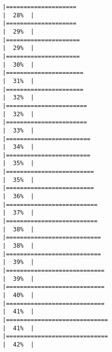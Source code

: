 \documentclass[
]{book}
\begin{document}
\begin{verbatim}
|====================                                                  |  28%  |                                                                              |====================                                                  |  29%  |                                                                              |=====================                                                 |  29%  |                                                                              |=====================                                                 |  30%  |                                                                              |======================                                                |  31%  |                                                                              |======================                                                |  32%  |                                                                              |=======================                                               |  32%  |                                                                              |=======================                                               |  33%  |                                                                              |========================                                              |  34%  |                                                                              |========================                                              |  35%  |                                                                              |=========================                                             |  35%  |                                                                              |=========================                                             |  36%  |                                                                              |==========================                                            |  37%  |                                                                              |==========================                                            |  38%  |                                                                              |===========================                                           |  38%  |                                                                              |===========================                                           |  39%  |                                                                              |============================                                          |  39%  |                                                                              |============================                                          |  40%  |                                                                              |============================                                          |  41%  |                                                                              |=============================                                         |  41%  |                                                                              |=============================                                         |  42%  |                                                                              
\end{verbatim}
\end{document}
